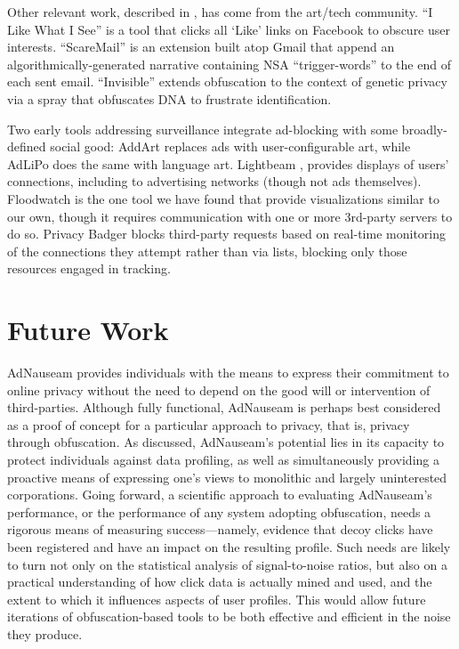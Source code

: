 \documentclass[conference]{IEEEtran}
\begin{document}
Other relevant work, described in \cite{Howe-3}, has come from the art/tech community. “I Like What I See” is a tool  that clicks all ‘Like’ links on Facebook to obscure user interests. “ScareMail” \cite{Grosser} is an extension built atop Gmail that append an algorithmically-generated narrative containing NSA “trigger-words” to the end of each sent email. “Invisible”\cite{Hagborg} extends obfuscation to the context of genetic privacy via a spray that obfuscates DNA to frustrate identification.

Two early tools addressing surveillance integrate ad-blocking with some broadly-defined social good: AddArt \cite{AddArt} replaces ads with user-configurable art, while AdLiPo \cite{Howe-0} does the same with language art. Lightbeam \cite{Mozilla}, provides displays of users' connections, including to advertising networks (though not ads themselves). Floodwatch \cite{Floodwatch} is the one tool we have found that provide visualizations similar to our own, though it requires communication with one or more 3rd-party servers to do so. Privacy Badger \cite{EFF-0} blocks third-party requests based on real-time monitoring of the connections they attempt rather than via lists, blocking only those resources engaged in tracking.

\section{Future Work}

AdNauseam provides individuals with the means to express their commitment to online privacy without the need to depend on the good will or intervention of third-parties. Although fully functional, AdNauseam is perhaps best considered as a proof of concept for a particular approach to privacy, that is, privacy through obfuscation. As discussed, AdNauseam's potential lies in its capacity to protect individuals against data profiling, as well as simultaneously providing a proactive means of expressing one's views to monolithic and largely uninterested corporations. Going forward, a scientific approach to evaluating AdNauseam's performance, or the performance of any system adopting obfuscation, needs a rigorous means of measuring success---namely, evidence that decoy clicks have been registered and have an impact on the resulting profile. Such needs are likely to turn not only on the statistical analysis of signal-to-noise ratios, but also on a practical understanding of how click data is actually mined and used, and the extent to which it influences aspects of user profiles. This would allow future iterations of obfuscation-based tools to be both effective and efficient in the noise they produce.
\end{document}
